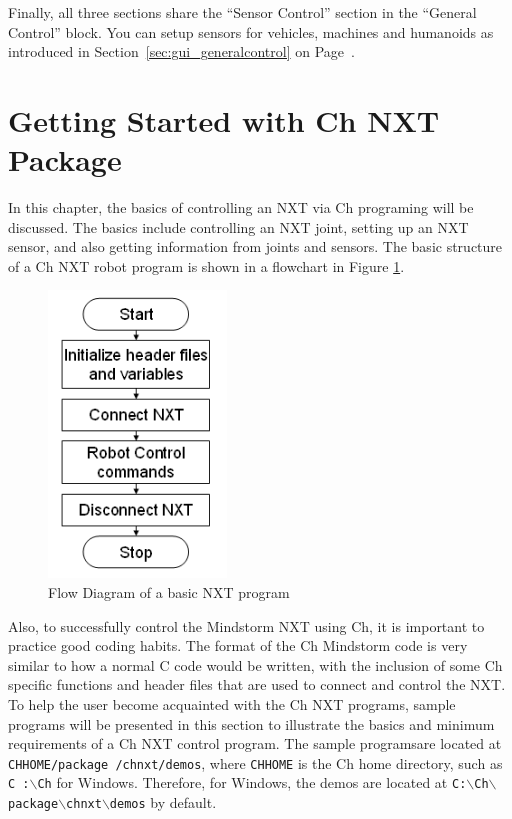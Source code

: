 \documentclass[11pt]{article}
\begin{document}
Finally, all three sections share the ``Sensor Control'' section in the ``General 
Control'' block. You can setup sensors for vehicles, machines and humanoids as
introduced in Section~\ref{sec:gui_generalcontrol} on 
Page~\pageref{sec:gui_generalcontrol}.

\newpage
\section{Getting Started with Ch NXT Package}
In this chapter, the basics of controlling an NXT via Ch programing will be discussed. 
The basics include controlling an NXT joint, setting up an NXT sensor, and also getting 
information from joints and sensors. The basic structure of a Ch NXT robot program 
is shown in a flowchart in Figure \ref{fig_NXT_pstruc}.\\
\begin{figure}[H]
  \begin{center}
    \includegraphics[height=3in]{figure/mindstorm/NXT_pstruc.png}
    \caption{Flow Diagram of a basic NXT program\label{fig_NXT_pstruc}}
  \end{center}
\end{figure}
Also, to successfully control the Mindstorm NXT using Ch, it is important to 
practice good coding habits. The format of the Ch Mindstorm code is very similar 
to how a normal C code would be written, with the inclusion of some Ch specific 
functions and header files that are used to connect and control the NXT. To help 
the user become acquainted with the Ch NXT programs, sample programs will be 
presented in this section to illustrate the basics and minimum requirements of a 
Ch NXT control program. The sample programsare located at {\tt CHHOME/package
/chnxt/demos}, where {\tt CHHOME} is the Ch home directory, such as {\tt C
:$\backslash$Ch} for Windows. Therefore, for Windows, the demos are located at 
{\tt C:$\backslash$Ch$\backslash$package$\backslash$chnxt$\backslash$demos} 
by default.
\end{document}
